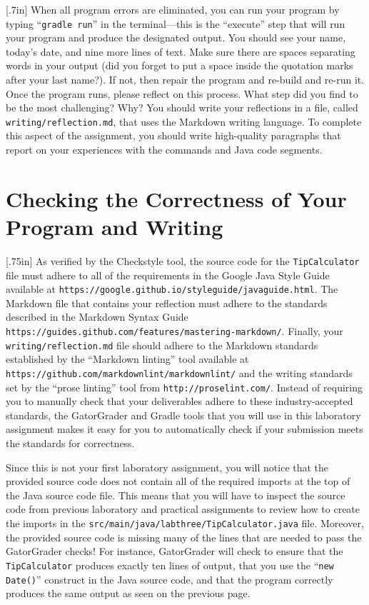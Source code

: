 \documentclass[11pt]{article}
\newcommand{\mainprogram}{\lstinline{TipCalculator}}
\newcommand{\mainprogramsource}{\lstinline{src/main/java/labthree/TipCalculator.java}}
\newcommand{\reflection}{\lstinline{writing/reflection.md}}
\newcommand{\gradlerun}{\command{gradle run}}
\newcommand{\command}[1]{``\lstinline{#1}''}
\newcommand{\url}[1]{\lstinline{#1}}
\newcommand{\step}[1]{``{#1}''}
\newcommand{\resource}[1]{\null\hfill\LARGE{\faLink{}}\newline\scriptsize{\em{#1}}}
\newcommand{\think}[1]{\null\hfill\LARGE{\faCogs{}}\newline\scriptsize{\em{#1}}}
\begin{document}
\marginnote{\think{Reflect on challenges}}[.7in] When all program errors are
eliminated, you can run your program by typing \gradlerun{} in the
terminal---this is the ``execute'' step that will run your program and produce
the designated output. You should see your name, today's date, and nine more
lines of text. Make sure there are spaces separating words in your output (did
you forget to put a space inside the quotation marks after your last name?). If
not, then repair the program and re-build and re-run it. Once the program runs,
please reflect on this process. What step did you find to be the most
challenging? Why? You should write your reflections in a file, called
\reflection{}, that uses the Markdown writing language. To complete this aspect
of the assignment, you should write high-quality paragraphs that report on your
experiences with the commands and Java code segments.

\section*{Checking the Correctness of Your Program and Writing}

\marginnote{\resource{Study style guides}}[.75in] As verified by the Checkstyle
tool, the source code for the \mainprogram{} file must adhere to all of the
requirements in the Google Java Style Guide available at
\url{https://google.github.io/styleguide/javaguide.html}. The Markdown file that
contains your reflection must adhere to the standards described in the Markdown
Syntax Guide \url{https://guides.github.com/features/mastering-markdown/}.
Finally, your \reflection{} file should adhere to the Markdown standards
established by the \step{Markdown linting} tool available at
\url{https://github.com/markdownlint/markdownlint/} and the writing standards
set by the \step{prose linting} tool from \url{http://proselint.com/}. Instead
of requiring you to manually check that your deliverables adhere to these
industry-accepted standards, the GatorGrader and Gradle tools that you will use
in this laboratory assignment makes it easy for you to automatically check if
your submission meets the standards for correctness.

Since this is not your first laboratory assignment, you will notice that the
provided source code does not contain all of the required imports at the top of
the Java source code file. This means that you will have to inspect the source
code from previous laboratory and practical assignments to review how to create
the imports in the \mainprogramsource{} file. Moreover, the provided source code
is missing many of the lines that are needed to pass the GatorGrader checks! For
instance, GatorGrader will check to ensure that the \mainprogram{} produces
exactly ten lines of output, that you use the \command{new Date()} construct in
the Java source code, and that the program correctly produces the same output as
seen on the previous page.
\end{document}
